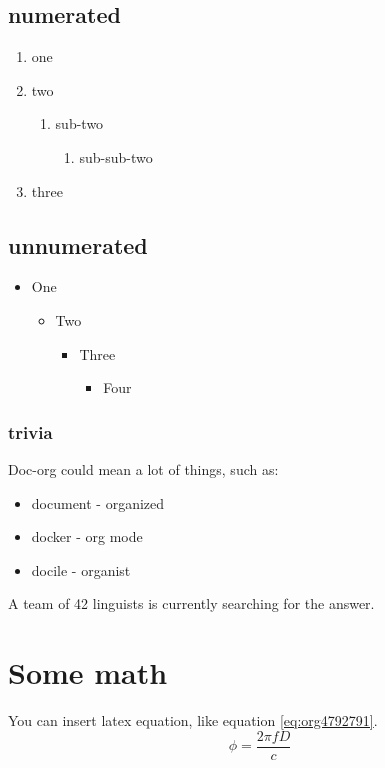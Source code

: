 \subsection{numerated}
\label{sec:org598648a}
\begin{enumerate}
\item one
\item two
\begin{enumerate}
\item sub-two
\begin{enumerate}
\item sub-sub-two
\end{enumerate}
\end{enumerate}
\item three
\end{enumerate}

\subsection{unnumerated}
\label{sec:org42f14c6}
\begin{itemize}
\item One
\begin{itemize}
\item Two
\begin{itemize}
\item Three
\begin{itemize}
\item Four
\end{itemize}
\end{itemize}
\end{itemize}
\end{itemize}

\subsubsection{trivia}
\label{sec:orgf3e1476}
Doc-org could mean a lot of things, such as:
\begin{itemize}
\item document - organized
\item docker - org mode
\item docile - organist
\end{itemize}
A team of 42 linguists is currently searching for the answer.

\section{Some math}
\label{sec:org391819b}
You can insert latex equation, like equation \ref{eq:org4792791}.
\begin{equation}
\label{eq:org4792791}
\phi = \frac{2\pi fD}{c}
\end{equation}

